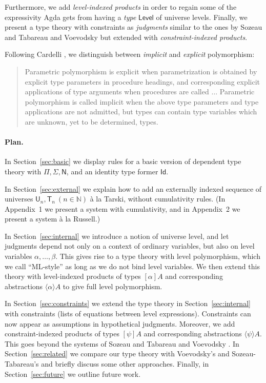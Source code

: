 \documentclass[a4paper,UKenglish,cleveref, autoref, thm-restate]{lipics-v2021}
\newcommand{\Id}{\mathsf{Id}}
\newcommand{\NN}{\mathsf{N}}
\newcommand{\Nat}{\mathbb{N}}
\newcommand{\UU}{\mathsf{U}}
\newcommand{\AgdaLevel}{\mathsf{Level}}
\newcommand{\lam}[1]{{\langle}#1{\rangle}}
\newcommand{\T}{\mathsf{T}}
\begin{document}
Furthermore, we add
\emph{level-indexed products} in order to regain some of the expressivity Agda gets from having a \emph{type}
$\AgdaLevel$ of universe levels.
Finally, we present a type theory with constraints as \emph{judgments} similar to the ones by Sozeau and Tabareau \cite{SozeauTabareau:coq} and Voevodsky \cite{VV} but extended with \emph{constraint-indexed products}.

Following Cardelli \cite{Cardelli87}, we distinguish between 
{\em implicit} and {\em explicit} polymorphism:
\begin{quotation}
  Parametric polymorphism is explicit when parametrization is obtained by
explicit type parameters in procedure headings, and corresponding explicit
applications of type arguments when procedures are called $\dots$
Parametric polymorphism is called implicit when the above type parameters and type applications are not admitted, but
types can contain type variables which are unknown, yet to be determined, types.
\end{quotation}

\paragraph{Plan.}
In Section~\ref{sec:basic} we display rules for a basic version of dependent 
type theory with $\Pi, \Sigma, \NN$, and an identity type former $\Id$.

In Section~\ref{sec:external} we explain how to add an externally indexed 
sequence of universes
$\UU_n, \T_n~(n\in\Nat)$ \`a la Tarski, without cumulativity rules.
(In Appendix~1 we present a system with cumulativity,
and in Appendix~2 we present a system \`a la Russell.)

In Section~\ref{sec:internal} we introduce a notion of universe level,
and let judgments depend not only on a context of ordinary variables,
but also on level variables $\alpha, \ldots, \beta$.
This gives rise to a type theory with level polymorphism, which we call
``ML-style'' as long as we do not bind level variables.
We then extend this theory with level-indexed products of
types $[\alpha]A$ and corresponding abstractions $\lam{\alpha}A$
to give full level polymorphism.

In Section~\ref{sec:constraints} we extend the type theory in
Section~\ref{sec:internal} with constraints (lists of equations between level expressions). Constraints can now appear as assumptions in hypothetical judgments. Moreover, we add
constraint-indexed products of types $[\psi]A$ and corresponding
abstractions $\lam{\psi}A$. This goes beyond the systems of Sozeau and Tabareau \cite{SozeauTabareau:coq} and Voevodsky \cite{VV}.
In Section~\ref{sec:related} we
compare our type theory with Voevodsky's and Sozeau-Tabareau's
and briefly discuss some other approaches.
Finally, in Section~\ref{sec:future} we outline future work.
\end{document}
